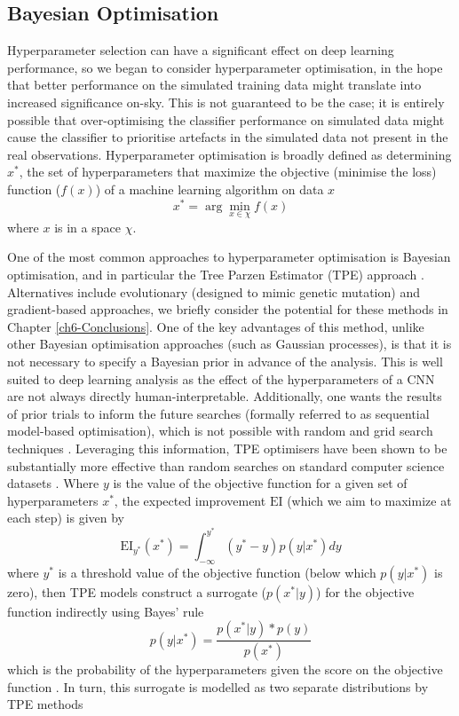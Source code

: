 \subsection{Bayesian Optimisation}
Hyperparameter selection can have a significant effect on deep learning performance, so we began to consider hyperparameter optimisation, in the hope that better performance on the simulated training data might translate into increased significance on-sky. This is not guaranteed to be the case; it is entirely possible that over-optimising the classifier performance on simulated data might cause the classifier to prioritise artefacts in the simulated data not present in the real observations. Hyperparameter optimisation is broadly defined as determining $x^*$, the set of hyperparameters that maximize the objective (minimise the loss) function ($f(x)$) of a machine learning algorithm on  data $x$ \begin{equation}
    x^*=\arg \min_{x \in \chi} f(x)
\end{equation}
where $x$ is in a space $\chi$.

One of the most common approaches to hyperparameter optimisation is Bayesian optimisation, and in particular the Tree Parzen Estimator (TPE) approach \cite{bergestra} \cite{tdshyper}. Alternatives include evolutionary (designed to mimic genetic mutation) and gradient-based approaches, we briefly consider the potential for these methods in Chapter \ref{ch6-Conclusions}. One of the key advantages of this method, unlike other Bayesian optimisation approaches (such as Gaussian processes), is that it is not necessary to specify a Bayesian prior in advance of the analysis. This is well suited to deep learning analysis as the effect of the hyperparameters of a CNN are not always directly human-interpretable. Additionally, one wants the results of prior trials to inform the future searches (formally referred to as sequential model-based optimisation), which is not possible with random and grid search techniques \cite{tdshyper}. Leveraging this information, TPE optimisers have been shown to be substantially more effective than random searches on standard computer science datasets \cite{bergestra}. Where $y$ is the value of the objective function for a given set of hyperparameters $x^*$, the expected improvement $\textrm{EI}$ (which we aim to maximize at each step) is given by
\begin{equation}
    \textrm{EI}_{y^*}(x^*)=\int_{-\infty}^{y^*}(y^*-y)p(y|x^*)dy
\end{equation}
where $y^*$ is a threshold value of the objective function (below which $p(y|x^*)$ is zero), then TPE models construct a surrogate ($p(x^*|y)$) for the objective function indirectly using Bayes' rule
\begin{equation}
    p(y|x^*)=\frac{p(x^*|y)*p(y)}{p(x^*)}
\end{equation}
which is the probability of the hyperparameters given the score on the objective function \cite{tdshyper}. In turn, this surrogate is modelled as two separate distributions by TPE methods

